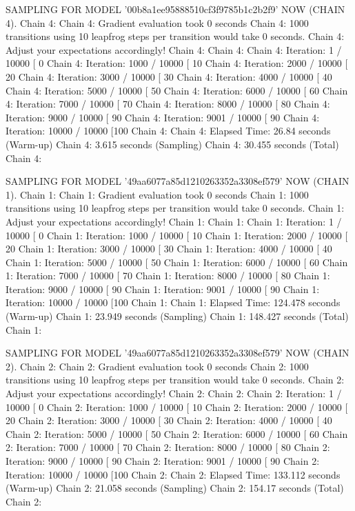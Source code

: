 \documentclass[
]{jss}
\begin{document}
\begin{CodeChunk}
\begin{CodeOutput}
SAMPLING FOR MODEL '00b8a1ee95888510cf3f9785b1c2b2f9' NOW (CHAIN 4).
Chain 4: 
Chain 4: Gradient evaluation took 0 seconds
Chain 4: 1000 transitions using 10 leapfrog steps per transition would take 0 seconds.
Chain 4: Adjust your expectations accordingly!
Chain 4: 
Chain 4: 
Chain 4: Iteration:    1 / 10000 [  0%
Chain 4: Iteration: 1000 / 10000 [ 10%
Chain 4: Iteration: 2000 / 10000 [ 20%
Chain 4: Iteration: 3000 / 10000 [ 30%
Chain 4: Iteration: 4000 / 10000 [ 40%
Chain 4: Iteration: 5000 / 10000 [ 50%
Chain 4: Iteration: 6000 / 10000 [ 60%
Chain 4: Iteration: 7000 / 10000 [ 70%
Chain 4: Iteration: 8000 / 10000 [ 80%
Chain 4: Iteration: 9000 / 10000 [ 90%
Chain 4: Iteration: 9001 / 10000 [ 90%
Chain 4: Iteration: 10000 / 10000 [100%
Chain 4: 
Chain 4:  Elapsed Time: 26.84 seconds (Warm-up)
Chain 4:                3.615 seconds (Sampling)
Chain 4:                30.455 seconds (Total)
Chain 4: 

SAMPLING FOR MODEL '49aa6077a85d1210263352a3308ef579' NOW (CHAIN 1).
Chain 1: 
Chain 1: Gradient evaluation took 0 seconds
Chain 1: 1000 transitions using 10 leapfrog steps per transition would take 0 seconds.
Chain 1: Adjust your expectations accordingly!
Chain 1: 
Chain 1: 
Chain 1: Iteration:    1 / 10000 [  0%
Chain 1: Iteration: 1000 / 10000 [ 10%
Chain 1: Iteration: 2000 / 10000 [ 20%
Chain 1: Iteration: 3000 / 10000 [ 30%
Chain 1: Iteration: 4000 / 10000 [ 40%
Chain 1: Iteration: 5000 / 10000 [ 50%
Chain 1: Iteration: 6000 / 10000 [ 60%
Chain 1: Iteration: 7000 / 10000 [ 70%
Chain 1: Iteration: 8000 / 10000 [ 80%
Chain 1: Iteration: 9000 / 10000 [ 90%
Chain 1: Iteration: 9001 / 10000 [ 90%
Chain 1: Iteration: 10000 / 10000 [100%
Chain 1: 
Chain 1:  Elapsed Time: 124.478 seconds (Warm-up)
Chain 1:                23.949 seconds (Sampling)
Chain 1:                148.427 seconds (Total)
Chain 1: 

SAMPLING FOR MODEL '49aa6077a85d1210263352a3308ef579' NOW (CHAIN 2).
Chain 2: 
Chain 2: Gradient evaluation took 0 seconds
Chain 2: 1000 transitions using 10 leapfrog steps per transition would take 0 seconds.
Chain 2: Adjust your expectations accordingly!
Chain 2: 
Chain 2: 
Chain 2: Iteration:    1 / 10000 [  0%
Chain 2: Iteration: 1000 / 10000 [ 10%
Chain 2: Iteration: 2000 / 10000 [ 20%
Chain 2: Iteration: 3000 / 10000 [ 30%
Chain 2: Iteration: 4000 / 10000 [ 40%
Chain 2: Iteration: 5000 / 10000 [ 50%
Chain 2: Iteration: 6000 / 10000 [ 60%
Chain 2: Iteration: 7000 / 10000 [ 70%
Chain 2: Iteration: 8000 / 10000 [ 80%
Chain 2: Iteration: 9000 / 10000 [ 90%
Chain 2: Iteration: 9001 / 10000 [ 90%
Chain 2: Iteration: 10000 / 10000 [100%
Chain 2: 
Chain 2:  Elapsed Time: 133.112 seconds (Warm-up)
Chain 2:                21.058 seconds (Sampling)
Chain 2:                154.17 seconds (Total)
Chain 2: 


\end{CodeOutput}
\end{CodeChunk}
\end{document}
